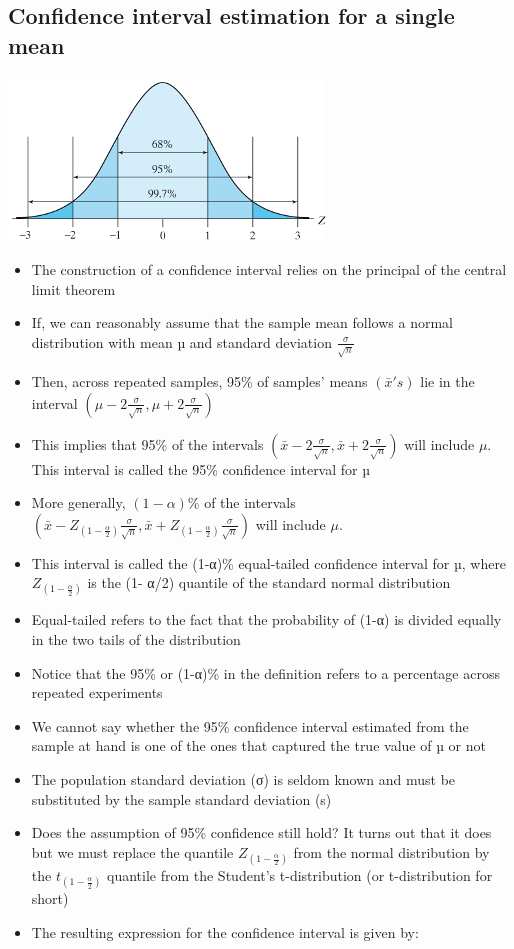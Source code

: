 \documentclass[
]{book}
\providecommand{\tightlist}{%
  \setlength{\itemsep}{0pt}\setlength{\parskip}{0pt}}
\begin{document}
\hypertarget{confidence-interval-estimation-for-a-single-mean}{%
\subsection{Confidence interval estimation for a single mean}\label{confidence-interval-estimation-for-a-single-mean}}

\includegraphics[width=0.5\linewidth]{./3_38}

\begin{itemize}
\tightlist
\item
  The construction of a confidence interval relies on the principal of the central limit theorem
\item
  If, we can reasonably assume that the sample mean follows a normal distribution with mean µ and standard deviation \(\frac{\sigma}{\sqrt n}\)
\item
  Then, across repeated samples, 95\% of samples' means \((\bar x's)\) lie in the interval \(\left(\mu-2\frac{\sigma}{\sqrt n},\mu+2\frac{\sigma}{\sqrt n}\right)\)
\item
  This implies that 95\% of the intervals \(\left(\bar x-2\frac{\sigma}{\sqrt n},\bar x+2\frac{\sigma}{\sqrt n}\right)\) will include \(\mu\). This interval is called the 95\% confidence interval for µ
\item
  More generally, \((1-\alpha)\)\% of the intervals \(\left(\bar x-Z_{(1-\frac{\alpha}{2})}\frac{\sigma}{\sqrt n},\bar x+Z_{(1-\frac{\alpha}{2})}\frac{\sigma}{\sqrt n}\right)\) will include \(\mu\).
\item
  This interval is called the (1-α)\% equal-tailed confidence interval for µ, where \(Z_{(1-\frac{\alpha}{2})}\) is the (1- α/2) quantile of the standard normal distribution
\item
  Equal-tailed refers to the fact that the probability of (1-α) is divided equally in the two tails of the distribution
\item
  Notice that the 95\% or (1-α)\% in the definition refers to a percentage across repeated experiments
\item
  We cannot say whether the 95\% confidence interval estimated from the sample at hand is one of the ones that captured the true value of µ or not
\item
  The population standard deviation (σ) is seldom known and must be substituted by the sample standard deviation (s)
\item
  Does the assumption of 95\% confidence still hold? It turns out that it does but we must replace the quantile \(Z_{(1-\frac{\alpha}{2})}\) from the normal distribution by the \(t_{(1-\frac{\alpha}{2})}\) quantile from the Student's t-distribution (or t-distribution for short)
\item
  The resulting expression for the confidence interval is given by:
\end{itemize}
\end{document}
